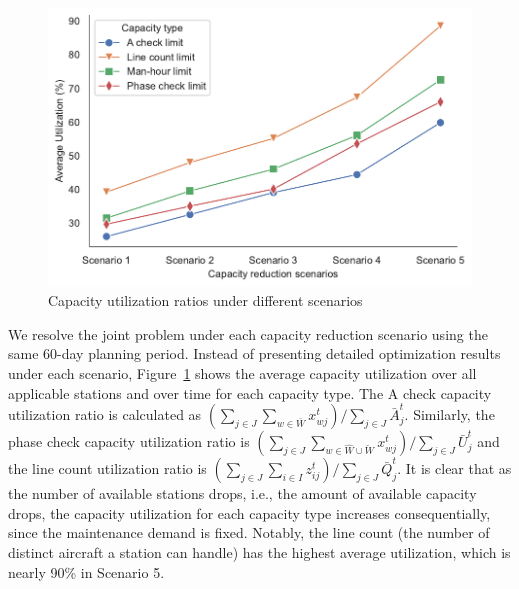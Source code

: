 \begin{table}[htbp]
\centering
\caption{Capacity reduction scenarios}
\label{tab:capacity_reduction}
\end{table}


 

\begin{figure}[htbp]
    \centering
     \includegraphics[width=0.7\linewidth]{utilization_v1.pdf}
    \caption{Capacity utilization ratios under different scenarios}
    \label{fig:impact_utilization}
\end{figure}

We resolve the joint problem under each capacity reduction scenario using the same 60-day planning period. Instead of presenting detailed optimization results under each scenario, Figure~\ref{fig:impact_utilization} shows the average capacity utilization over all applicable stations and over time for each capacity type. The A check capacity utilization ratio is calculated as $\left(\sum_{j \in J}\sum_{w \in \bar{W}}x_{wj}^t\right) /\sum_{j \in J}\bar{A}_j^t$. Similarly, the phase check capacity utilization ratio is $\left(\sum_{j \in J}\sum_{w \in \hat{W}\cup\breve{W}}x_{wj}^t\right) /\sum_{j \in J}\bar{U}_j^t$ and the line count utilization ratio is $\left(\sum_{j \in J}\sum_{i \in I}z_{ij}^t\right) /\sum_{j \in J}\bar{Q}_j^t$. It is clear that as the number of available stations drops, i.e., the amount of available capacity drops, the capacity utilization for each capacity type increases consequentially, since the maintenance demand is fixed. Notably, the line count (the number of distinct aircraft a station can handle) has the highest average utilization, which is nearly 90\% in Scenario 5.

